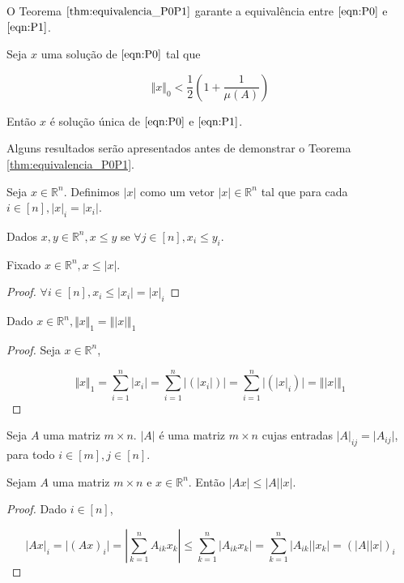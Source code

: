 O Teorema $\ref{thm:equivalencia_P0P1}$ garante a equivalência entre $\eqref{eqn:P0}$ e $\eqref{eqn:P1}$.

\begin{teorema}
Seja $x$ uma solução de $\eqref{eqn:P0}$ tal que

$$ \Vert x \Vert_0 < \frac{1}{2} \left(1 + \frac{1}{\mu(A)}\right) $$

Então $x$ é solução única de $\eqref{eqn:P0}$ e $\eqref{eqn:P1}$.
\label{thm:equivalencia_P0P1}
\end{teorema}

Alguns resultados serão apresentados antes de demonstrar o Teorema \ref{thm:equivalencia_P0P1}.

\begin{definicao}
Seja $x \in \mathbb{R}^n$. Definimos $\vert x \vert$ como um vetor $\vert x \vert \in \mathbb{R}^n$ tal que para cada $i \in [n], \vert x \vert_i = \vert x_i \vert$.
\end{definicao}

\begin{definicao}
Dados $x, y \in \mathbb{R}^n, x \leq y$ se $\forall j \in [n], x_i \leq y_i$.
\end{definicao}

\begin{lema}
Fixado $x \in \mathbb{R}^n, x \leq \vert x \vert$.
\end{lema}
\begin{proof}
$ \forall i \in [n], x_i \leq \vert x_i \vert = \vert x \vert_i$
\end{proof}

\begin{lema} %
Dado $x \in \mathbb{R}^n, \Vert x \Vert_1 = \Vert \vert x \vert \Vert_1$
\end{lema}
\begin{proof}
Seja $x \in \mathbb{R}^n$,

$$\Vert x \Vert_1 = \sum_{i = 1}^n \vert x_i \vert = \sum_{i = 1}^n \vert (\vert x_i \vert) \vert
= \sum_{i = 1}^n \vert (\vert x \vert_i) \vert = \Vert \vert x \vert \Vert_1$$
\end{proof}

\begin{definicao}
Seja $A$ uma matriz $m \times n$. $\vert A \vert$ é uma matriz $m \times n$ cujas entradas $\vert A \vert_{ij} = \vert A_{ij} \vert$, para todo $i \in [m], j \in [n]$.
\end{definicao}

\begin{lema}
Sejam $A$ uma matriz $m \times n$ e $x \in \mathbb{R}^n$. Então $\vert Ax \vert \leq \vert A \vert \vert x \vert$.
\end{lema}
\begin{proof}
Dado $i \in [n]$,

$$ \vert Ax \vert_i = \vert (Ax)_i \vert = \left| \sum_{k = 1}^n A_{ik}x_k \right|
\leq  \sum_{k = 1}^n \vert A_{ik}x_k \vert 
=     \sum_{k = 1}^n \vert A_{ik} \vert \vert x_k \vert
=     (\vert A \vert \vert x \vert)_i
$$
\end{proof}

